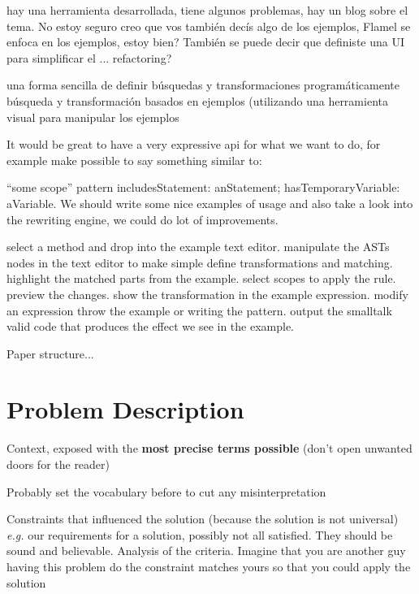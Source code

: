 \documentclass{article}
\begin{document}
\medskip 

hay una herramienta desarrollada, tiene algunos problemas, hay un blog sobre el tema.
No estoy seguro creo que vos también decís algo de los ejemplos, Flamel se enfoca en los ejemplos, estoy bien?
También se puede decir que definiste una UI para simplificar el ... refactoring?

\medskip 

una forma sencilla de definir búsquedas y transformaciones programáticamente
búsqueda y transformación basados en ejemplos (utilizando una herramienta visual para manipular los ejemplos

It would be great to have a very expressive api for what we want to do, for example make possible to say something similar to:

“some scope” pattern
includesStatement: anStatement;
hasTemporaryVariable: aVariable.
We should write some nice examples of usage and also take a look into the rewriting engine, we could do lot of improvements.

select a method and drop into the example text editor.
manipulate the ASTs nodes in the text editor to make simple define transformations and matching.
highlight the matched parts from the example.
select scopes to apply the rule.
preview the changes.
show the transformation in the example expression.
modify an expression throw the example or writing the pattern.
output the smalltalk valid code that produces the effect we see in the example.


\medskip 
Paper structure...


\section{Problem Description}
\label{sec:problem}

Context, exposed with the \textbf{most precise terms possible} (don't open
unwanted doors for the reader)


Probably set the vocabulary before to cut any misinterpretation

Constraints that influenced the solution (because the solution is not
universal) \emph{e.g.} our requirements for a solution, possibly not all
satisfied. They should be sound and believable. Analysis of the criteria.
Imagine that you are another guy having this problem do the constraint
matches yours so that you could apply the solution
\end{document}
